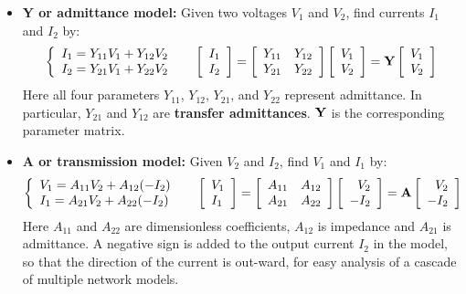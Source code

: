 \documentclass{article}
\begin{document}
\begin{itemize}
\item {\bf Y or admittance model:} Given two voltages $V_1$ and $V_2$,
  find currents $I_1$ and $I_2$ by:
  \begin{equation}
    \left\{ \begin{array}{l} I_1=Y_{11}V_1+Y_{12}V_2 \\
      I_2=Y_{21}V_1+Y_{22}V_2 \end{array} \right.\;\;\;\;\;
    \left[ \begin{array}{l} I_1 \\ I_2\end{array} \right]=
    \left[ \begin{array}{ll} Y_{11} & Y_{12}\\Y_{21} & Y_{22}\end{array}\right]
    \left[ \begin{array}{l} V_1 \\ V_2\end{array} \right]
    ={\bf Y}\left[ \begin{array}{l} V_1 \\ V_2\end{array} \right]  
  \end{equation}
  Here all four parameters $Y_{11}$, $Y_{12}$, $Y_{21}$, and $Y_{22}$ represent
  admittance. In particular, $Y_{21}$ and $Y_{12}$ are {\bf transfer admittances}. 
  ${\bf Y}$ is the corresponding parameter matrix.

\item {\bf A or transmission model:} Given $V_2$ and $I_2$, find 
  $V_1$ and $I_1$ by:
  \begin{equation}
    \left\{ \begin{array}{l} 
      V_1=A_{11}V_2+A_{12}(-I_2) \\
      I_1=A_{21}V_2+A_{22}(-I_2) \end{array} \right.\;\;\;\;\;
    \left[ \begin{array}{l} V_1 \\ I_1\end{array} \right]=
    \left[ \begin{array}{ll} A_{11} & A_{12}\\A_{21} & A_{22}\end{array}\right]
    \left[ \begin{array}{r} V_2 \\ -I_2\end{array} \right]
    ={\bf A}\left[ \begin{array}{r} V_2 \\ -I_2\end{array} \right]  
  \end{equation}
  Here $A_{11}$ and $A_{22}$ are dimensionless coefficients, $A_{12}$ is impedance 
  and $A_{21}$ is admittance. A negative sign is added to the output current $I_2$ 
  in the model, so that the direction of the current is out-ward, for easy
  analysis of a cascade of multiple network models.


\end{itemize}
\end{document}
